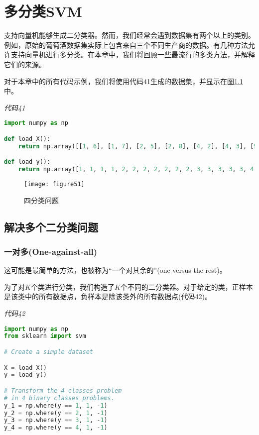 \chapter{多分类SVM}

支持向量机能够生成二分类器。然而，我们经常会遇到数据集有两个以上的类别。例如，原始的葡萄酒数据集实际上包含来自三个不同生产商的数据。有几种方法允许支持向量机进行多分类。在本章中，我们将回顾一些最流行的多类方法，并解释它们的来源。

对于本章中的所有代码示例，我们将使用代码41生成的数据集，并显示在图\ref{figure51}中。

\emph{代码41}

\begin{lstlisting}[language=python]
import numpy as np 

def load_X(): 
    return np.array([[1, 6], [1, 7], [2, 5], [2, 8], [4, 2], [4, 3], [5, 1], [5, 2], [5, 3], [6, 1], [6, 2], [9, 4], [9, 7], [10, 5], [10, 6], [11, 6], [5, 9], [5, 10], [5, 11], [6, 9], [6, 10], [7, 10], [8, 11]]) 

def load_y(): 
    return np.array([1, 1, 1, 1, 2, 2, 2, 2, 2, 2, 2, 3, 3, 3, 3, 3, 4, 4, 4, 4, 4, 4, 4])

\end{lstlisting}

\begin{figure}[ht]
	\centering
	\texttt{[image: figure51]}
	\caption{四分类问题}
	\label{figure51}
\end{figure}



\section{解决多个二分类问题}
\subsection{一对多(One-against-all)}

这可能是最简单的方法，也被称为“一个对其余的”(one-versus-the-rest)。

为了对$K$个类进行分类，我们构造了$K$个不同的二分类器。对于给定的类，正样本是该类中的所有数据点，负样本是除该类外的所有数据点(代码42)。

\emph{代码42}

\begin{lstlisting}[language=python]
import numpy as np 
from sklearn import svm 

# Create a simple dataset 

X = load_X() 
y = load_y() 

# Transform the 4 classes problem 
# in 4 binary classes problems. 
y_1 = np.where(y == 1, 1, -1) 
y_2 = np.where(y == 2, 1, -1) 
y_3 = np.where(y == 3, 1, -1) 
y_4 = np.where(y == 4, 1, -1)

\end{lstlisting}

